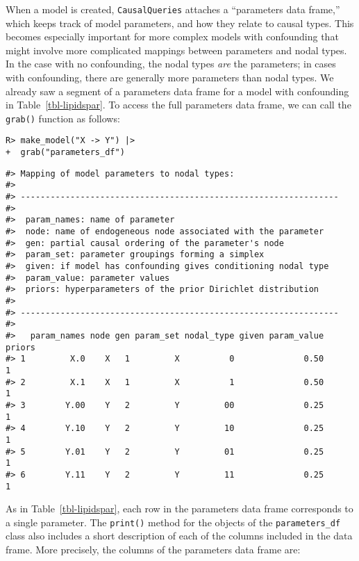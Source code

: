 \documentclass[
  11pt,
  article]{jss}
\begin{document}
When a model is created, \texttt{CausalQueries} attaches a ``parameters
data frame,'' which keeps track of model parameters, and how they relate
to causal types. This becomes especially important for more complex
models with confounding that might involve more complicated mappings
between parameters and nodal types. In the case with no confounding, the
nodal types \emph{are} the parameters; in cases with confounding, there
are generally more parameters than nodal types. We already saw a segment
of a parameters data frame for a model with confounding in
Table~\ref{tbl-lipidspar}. To access the full parameters data frame, we
can call the \texttt{grab()} function as follows:

\begin{verbatim}
R> make_model("X -> Y") |> 
+  grab("parameters_df") 
\end{verbatim}

\begin{verbatim}
#> Mapping of model parameters to nodal types: 
#> 
#> ----------------------------------------------------------------
#> 
#>  param_names: name of parameter
#>  node: name of endogeneous node associated with the parameter
#>  gen: partial causal ordering of the parameter's node
#>  param_set: parameter groupings forming a simplex
#>  given: if model has confounding gives conditioning nodal type
#>  param_value: parameter values
#>  priors: hyperparameters of the prior Dirichlet distribution 
#> 
#> ----------------------------------------------------------------
#> 
#>   param_names node gen param_set nodal_type given param_value priors
#> 1         X.0    X   1         X          0              0.50      1
#> 2         X.1    X   1         X          1              0.50      1
#> 3        Y.00    Y   2         Y         00              0.25      1
#> 4        Y.10    Y   2         Y         10              0.25      1
#> 5        Y.01    Y   2         Y         01              0.25      1
#> 6        Y.11    Y   2         Y         11              0.25      1
\end{verbatim}

As in Table~\ref{tbl-lipidspar}, each row in the parameters data frame
corresponds to a single parameter. The \texttt{print()} method for the
objects of the \texttt{parameters\_df} class also includes a short
description of each of the columns included in the data frame. More
precisely, the columns of the parameters data frame are:
\end{document}
